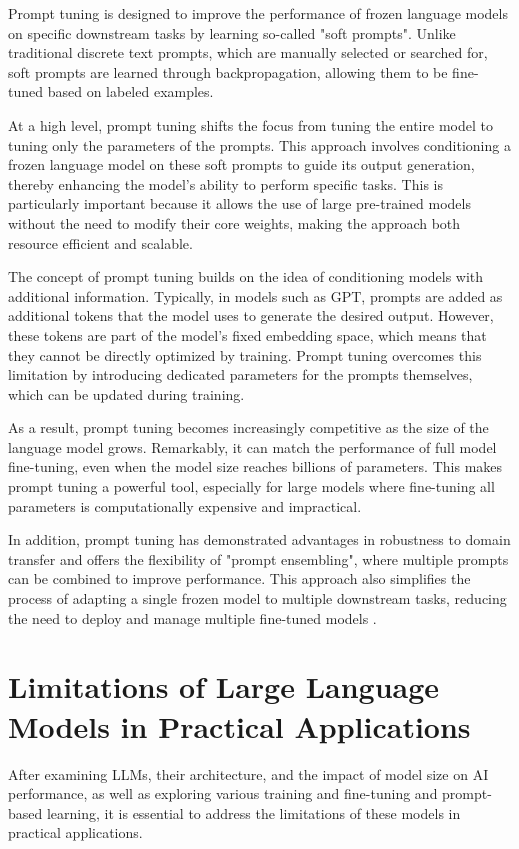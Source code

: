 Prompt tuning is designed to improve the performance of frozen language models on specific downstream tasks by learning so-called "soft prompts". Unlike traditional discrete text prompts, which are manually selected or searched for, soft prompts are learned through backpropagation, allowing them to be fine-tuned based on labeled examples.

At a high level, prompt tuning shifts the focus from tuning the entire model to tuning only the parameters of the prompts. This approach involves conditioning a frozen language model on these soft prompts to guide its output generation, thereby enhancing the model's ability to perform specific tasks. This is particularly important because it allows the use of large pre-trained models without the need to modify their core weights, making the approach both resource efficient and scalable.

The concept of prompt tuning builds on the idea of conditioning models with additional information. Typically, in models such as GPT, prompts are added as additional tokens that the model uses to generate the desired output. However, these tokens are part of the model's fixed embedding space, which means that they cannot be directly optimized by training. Prompt tuning overcomes this limitation by introducing dedicated parameters for the prompts themselves, which can be updated during training.

As a result, prompt tuning becomes increasingly competitive as the size of the language model grows. Remarkably, it can match the performance of full model fine-tuning, even when the model size reaches billions of parameters. This makes prompt tuning a powerful tool, especially for large models where fine-tuning all parameters is computationally expensive and impractical.

In addition, prompt tuning has demonstrated advantages in robustness to domain transfer and offers the flexibility of "prompt ensembling", where multiple prompts can be combined to improve performance. This approach also simplifies the process of adapting a single frozen model to multiple downstream tasks, reducing the need to deploy and manage multiple fine-tuned models \cite{lester2021power}.

\section{Limitations of Large Language Models in Practical Applications}

After examining LLMs, their architecture, and the impact of model size on AI performance, as well as exploring various training and fine-tuning and prompt-based learning, it is essential to address the limitations of these models in practical applications.

